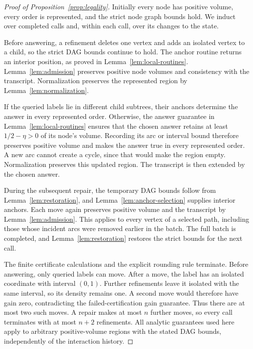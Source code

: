 \begin{proof}[Proof of Proposition~\ref{prop:legality}]
Initially every node has positive volume, every order is represented,
and the strict node graph bounds hold. We induct over completed calls
and, within each call, over its changes to the state.

Before answering, a refinement deletes one vertex and adds an isolated
vertex to a child, so the strict DAG bounds continue to hold. The anchor
routine returns an interior position, as proved in
Lemma~\ref{lem:local-routines}. Lemma~\ref{lem:admission}
preserves positive node volumes and consistency with the transcript.
Normalization preserves the represented region by
Lemma~\ref{lem:normalization}.

If the queried labels lie in different child subtrees, their anchors
determine the answer in every represented order. Otherwise, the
answer guarantee in Lemma~\ref{lem:local-routines} ensures that the chosen answer retains at least
$1/2-\eta>0$ of its node's volume. Recording its arc or interval bound
therefore preserves positive volume and makes the answer true in every
represented order. A new arc cannot create a cycle, since that would
make the region empty. Normalization preserves this updated region.
The transcript is then extended by the chosen answer.

During the subsequent repair, the temporary DAG bounds follow from
Lemma~\ref{lem:restoration}, and Lemma~\ref{lem:anchor-selection}
supplies interior anchors. Each move again preserves positive volume
and the transcript by Lemma~\ref{lem:admission}. This applies to every
vertex of a selected path, including those whose incident arcs were
removed earlier in the batch. The full batch is completed, and
Lemma~\ref{lem:restoration} restores the strict bounds for the next call.

The finite certificate calculations and the explicit rounding rule
terminate. Before answering, only queried labels can move. After a
move, the label has an isolated coordinate with interval $(0,1)$. Further
refinements leave it isolated with the same interval, so its density
remains one. A second move would therefore have gain zero, contradicting
the failed-certification gain guarantee. Thus there are at most two
such moves. A repair makes at most $n$ further moves,
so every call terminates with at most $n+2$ refinements.
All analytic guarantees used here apply to arbitrary positive-volume
regions with the stated DAG bounds, independently of the interaction
history.
\end{proof}
